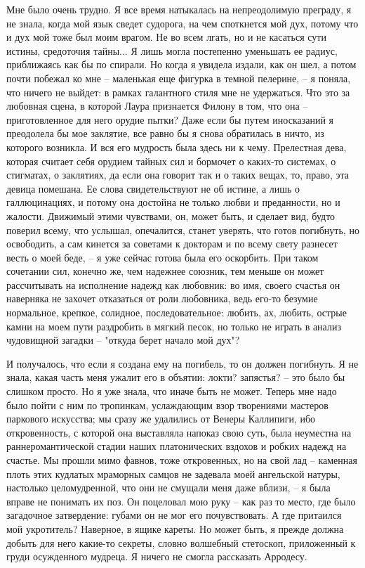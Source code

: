 Мне  было  очень  трудно.  Я  все  время  натыкалась  на  непреодолимую
преграду,  я не знала, когда мой язык сведет судорога, на чем споткнется мой
дух, потому что и дух мой тоже был моим врагом. Не во всем лгать,  но  и  не
касаться  сути истины, средоточия тайны... Я лишь могла постепенно уменьшать
ее радиус, приближаясь как бы по спирали. Но когда я увидела издали, как  он
шел,  а  потом  почти  побежал  ко  мне  --  маленькая  еще фигурка в темной
пелерине, -- я поняла, что ничего не выйдет: в рамках галантного  стиля  мне
не  удержаться. Что это за любовная сцена, в которой Лаура признается Филону
в том, что она -- приготовленное для него орудие пытки? Даже если  бы  путем
иносказаний  я преодолела бы мое заклятие, все равно бы я снова обратилась в
ничто, из которого возникла. И вся  его  мудрость  была  здесь  ни  к  чему.
Прелестная  дева,  которая  считает  себя  орудием  тайных  сил и бормочет о
каких-то системах, о стигматах, о заклятиях, да если она  говорит  так  и  о
таких  вещах, то, право, эта девица помешана. Ее слова свидетельствуют не об
истине, а лишь о галлюцинациях, и потому она  достойна  не  только  любви  и
преданности,  но  и  жалости.  Движимый  этими  чувствами, он, может быть, и
сделает вид, будто поверил всему, что услышал, опечалится,  станет  уверять,
что  готов  погибнуть, но освободить, а сам кинется за советами к докторам и
по всему свету разнесет весть о моей беде, -- я уже сейчас готова  была  его
оскорбить.  При  таком  сочетании сил, конечно же, чем надежнее союзник, тем
меньше он может рассчитывать на исполнение  надежд  как  любовник:  во  имя,
своего  счастья  он  наверняка не захочет отказаться от роли любовника, ведь
его-то безумие нормальное, крепкое, солидное, последовательное: любить,  ах,
любить,  острые  камни  на моем пути раздробить в мягкий песок, но только не
играть в анализ чудовищной загадки -- "откуда берет начало мой дух"?

И получалось, что  если  я  создана  ему  на  погибель,  то  он  должен
погибнуть.  Я  не  знала,  какая  часть  меня  ужалит  его в объятии: локти?
запястья? -- это было бы слишком просто. Но я уже знала, что иначе  быть  не
может.  Теперь  мне  надо  было  пойти  с ним по тропинкам, услаждающим взор
творениями мастеров паркового искусства; мы сразу  же  удалились  от  Венеры
Каллипиги,  ибо  откровенность,  с которой она выставляла напоказ свою суть,
была неуместна на раннеромантической стадии наших  платонических  вздохов  и
робких  надежд  на  счастье.  Мы прошли мимо фавнов, тоже откровенных, но на
свой лад -- каменная плоть этих кудлатых мраморных самцов не  задевала  моей
ангельской  натуры,  настолько  целомудренной,  что они не смущали меня даже
вблизи, -- я была вправе не понимать их поз. Он поцеловал мою  руку  --  как
раз  то  место,  где  было  загадочное  затвердение:  губами  он  не мог его
почувствовать. А где притаился мой укротитель? Наверное, в ящике кареты.  Но
может  быть,  я  прежде  должна  добыть  для  него  какие-то секреты, словно
волшебный стетоскоп, приложенный к груди осужденного мудреца.  Я  ничего  не
смогла рассказать Арродесу.

